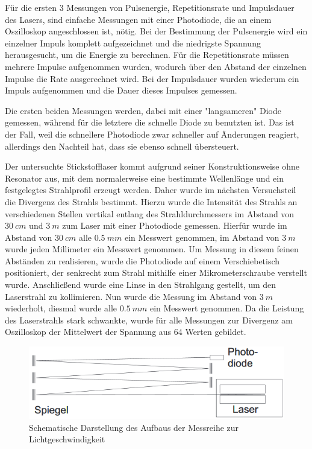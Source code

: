 \documentclass[
	a4paper,
	12pt,
	pagesize,
	ngerman
]{scrartcl}
\begin{document}
Für die ersten 3 Messungen von Pulsenergie, Repetitionsrate und Impulsdauer des Lasers, sind einfache Messungen mit einer Photodiode, die an einem Oszilloskop angeschlossen ist, nötig.
Bei der Bestimmung der Pulsenergie wird ein einzelner Impuls komplett aufgezeichnet und die niedrigste Spannung herausgesucht, um die Energie zu berechnen. 
Für die Repetitionsrate müssen mehrere Impulse aufgenommen wurden, wodurch über den Abstand der einzelnen Impulse die Rate ausgerechnet wird.
Bei der Impulsdauer wurden wiederum ein Impuls aufgenommen und die Dauer dieses Impulses gemessen.

Die ersten beiden Messungen werden, dabei mit einer "langsameren" Diode gemessen, während für die letztere die schnelle Diode zu benutzten ist. Das ist der Fall, weil die schnellere Photodiode zwar schneller auf Änderungen reagiert, allerdings den Nachteil hat, dass sie ebenso schnell übersteuert.

Der untersuchte Stickstofflaser kommt aufgrund seiner Konstruktionsweise ohne Resonator aus, mit dem normalerweise eine bestimmte Wellenlänge und ein festgelegtes Strahlprofil erzeugt werden. Daher wurde im nächsten Versuchsteil die Divergenz des Strahls bestimmt. Hierzu wurde die Intensität des Strahls an verschiedenen Stellen vertikal entlang des Strahldurchmessers im Abstand von $\SI{30}{cm}$ und $\SI{3}{m}$ zum Laser mit einer Photodiode gemessen. Hierfür wurde im Abstand von $\SI{30}{cm}$ alle $\SI{0,5}{mm}$ ein Messwert genommen, im Abstand von $\SI{3}{m}$ wurde jeden Millimeter ein Messwert genommen. Um Messung in diesem feinen Abständen zu realisieren, wurde die Photodiode auf einem Verschiebetisch positioniert, der senkrecht zum Strahl mithilfe einer Mikrometerschraube verstellt wurde.
Anschließend wurde eine Linse in den Strahlgang gestellt, um den Laserstrahl zu kollimieren. Nun wurde die Messung im Abstand von $\SI{3}{m}$ wiederholt, diesmal wurde alle $\SI{0,5}{mm}$ ein Messwert genommen. Da die Leistung des Laserstrahls stark schwankte, wurde für alle Messungen zur Divergenz am Oszilloskop der Mittelwert der Spannung aus 64 Werten gebildet.

\begin{figure}[h!]
	\centering
	\includegraphics[scale=0.9]{skizze_c.png}
	\caption{Schematische Darstellung des Aufbaus der Messreihe zur Lichtgeschwindigkeit}
	\label{skizze_c}
\end{figure}
\end{document}
